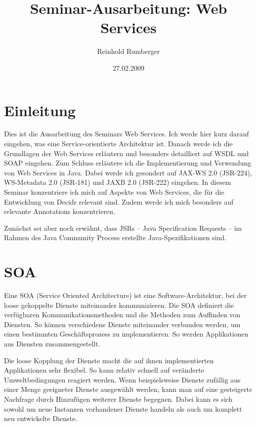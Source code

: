 \documentclass[runningheads]{llncs}
\author{Reinhold Rumberger}
\institute{Institute of Architecture of Application Systems (IAAS)
  \email{rumberrd@studi.informatik.uni-stuttgart.de}}
\title{Seminar-Ausarbeitung: Web Services}
\date{27.02.2009}
\newcommand{\germanquote}[1]{\glqq{}#1\grqq{}}
\newcommand{\decidr}{Decidr}
\begin{document}

  \frontmatter
  \pagestyle{headings}

  \maketitle
  \tableofcontents
  \mainmatter

  \label{intro}
  \section{Einleitung}
    Dies ist die Ausarbeitung des Seminars \germanquote{Web Services}. Ich werde hier kurz darauf eingehen, was eine Service-orientierte Architektur ist. Danach werde ich die Grundlagen der Web Services erläutern und besonders detailliert auf WSDL und SOAP eingehen. Zum Schluss erläutere ich die Implementierung und Verwendung von Web Services in Java. Dabei werde ich gesondert auf JAX-WS 2.0 (JSR-224), WS-Metadata 2.0 (JSR-181) und JAXB 2.0 (JSR-222) eingehen. In diesem Seminar konzentriere ich mich auf Aspekte von Web Services, die für die Entwicklung von \decidr{} relevant sind. Zudem werde ich mich besonders auf relevante Annotations konzentrieren.

    Zunächst sei aber noch erwähnt, dass \germanquote{JSRs} -- Java Specification Requests -- im Rahmen des Java Community Process erstellte Java-Spezifikationen sind.


  \label{soa}
  \section{SOA}
  \nocite{wk_soa}
    Eine \germanquote{SOA} (Service Oriented Architecture) ist eine Software-Architektur, bei der loose gekoppelte Dienste miteinander kommunizieren. Die SOA definiert die verfügbaren Kommunikationsmethoden und die Methoden zum Auffinden von Diensten. So können verschiedene Dienste miteinander verbunden werden, um einen bestimmten Geschäftsprozess zu implementieren. So werden Applikationen aus Diensten zusammengestellt.

    Die loose Kopplung der Dienste macht die auf ihnen implementierten Applikationen sehr flexibel. So kann relativ schnell auf veränderte Umweltbedingungen reagiert werden. Wenn beispielsweise Dienste zufällig aus einer Menge geeigneter Dienste ausgewählt werden, kann man auf eine gesteigerte Nachfrage durch Hinzufügen weiterer Dienste begegnen. Dabei kann es sich sowohl um neue Instanzen vorhandener Dienste handeln als auch um komplett neu entwickelte Dienste.
\end{document}
